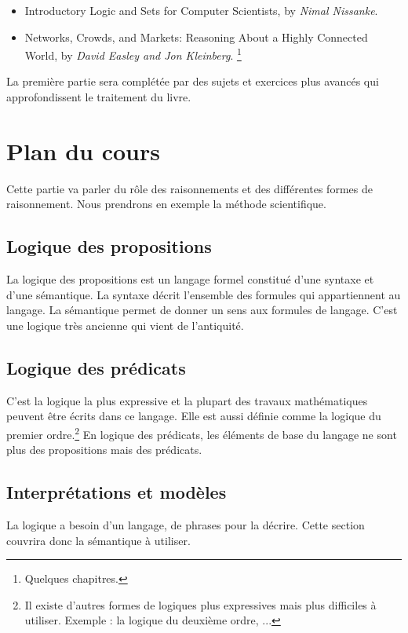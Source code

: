\begin{itemize}
\item Introductory Logic and Sets for Computer Scientists, by \textit{Nimal Nissanke}.
\item Networks, Crowds, and Markets: Reasoning About a Highly Connected World, by \textit{David Easley and Jon Kleinberg}. \footnote{Quelques chapitres.}
\end{itemize}

La première partie sera complétée par des sujets et exercices plus avancés qui approfondissent le traitement du livre.

\section{Plan du cours}

Cette partie va parler du rôle des raisonnements et des différentes formes de raisonnement. Nous prendrons en exemple la méthode scientifique.

\subsection{Logique des propositions}

La logique des propositions est un langage formel constitué d'une syntaxe et d'une sémantique. La syntaxe décrit l'ensemble des formules qui appartiennent au langage. La sémantique permet de donner un sens aux formules de langage. C'est une logique très ancienne qui vient de l'antiquité. 

\subsection{Logique des prédicats}

C'est la logique la plus expressive et la plupart des travaux mathématiques peuvent être écrits dans ce langage. Elle est aussi définie comme la logique du premier ordre.\footnote{Il existe d'autres formes de logiques plus expressives mais plus difficiles à utiliser. Exemple : la logique du deuxième ordre, ...} En logique des prédicats, les éléments de base du langage ne sont plus des propositions mais des prédicats. 

\subsection{Interprétations et modèles}

La logique a besoin d'un langage, de phrases pour la décrire. Cette section couvrira donc la sémantique à utiliser.

